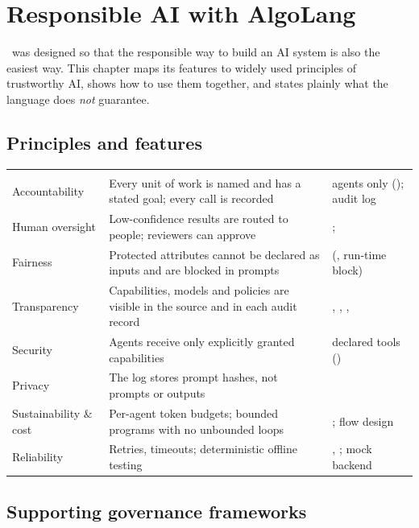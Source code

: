 \chapter{Responsible AI with AlgoLang}
\label{ch:responsible}

\algolang\ was designed so that the responsible way to build an AI system is also the easiest way. This chapter maps its features to widely used principles of trustworthy AI, shows how to use them together, and states plainly what the language does \emph{not} guarantee.

\section{Principles and features}

\begin{center}
\small
\begin{tabularx}{\linewidth}{@{}L{3.2cm}YL{3.6cm}@{}}
\toprule
{} &  & \\
\goldrule
Accountability & Every unit of work is named and has a stated goal; every call is recorded & agents only (); audit log\\
Human oversight & Low-confidence results are routed to people; reviewers can approve & ; \\
Fairness & Protected attributes cannot be declared as inputs and are blocked in prompts &  (, run-time block)\\
Transparency & Capabilities, models and policies are visible in the source and in each audit record & , , , \\
Security & Agents receive only explicitly granted capabilities & declared tools ()\\
Privacy & The log stores prompt hashes, not prompts or outputs & \\
Sustainability \& cost & Per-agent token budgets; bounded programs with no unbounded loops & ; flow design\\
Reliability & Retries, timeouts; deterministic offline testing & , ; mock backend\\
\bottomrule
\end{tabularx}
\end{center}

\section{Supporting governance frameworks}

